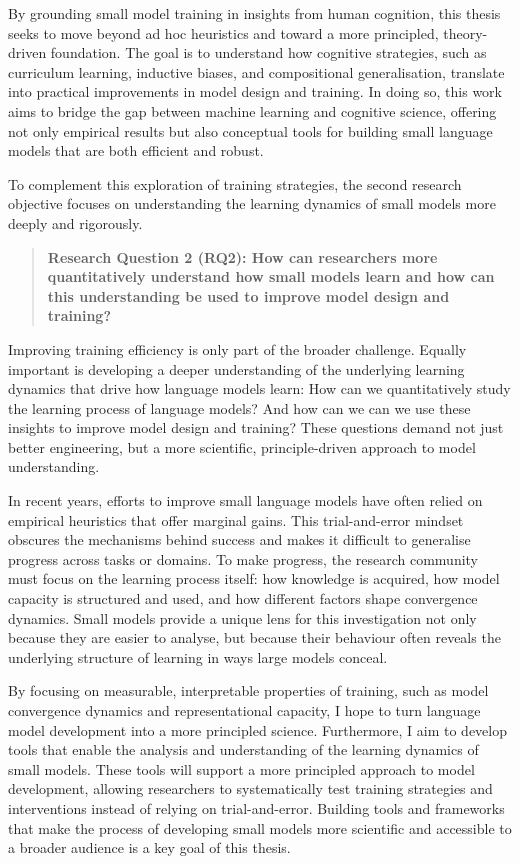 By grounding small model training in insights from human cognition, this thesis seeks to move beyond ad hoc heuristics and toward a more principled, theory-driven foundation. The goal is to understand how cognitive strategies, such as curriculum learning, inductive biases, and compositional generalisation, translate into practical improvements in model design and training. In doing so, this work aims to bridge the gap between machine learning and cognitive science, offering not only empirical results but also conceptual tools for building small language models that are both efficient and robust.

To complement this exploration of training strategies, the second research objective focuses on understanding the learning dynamics of small models more deeply and rigorously.

\begin{quote}
    \textbf{Research Question 2 (RQ2): How can researchers more quantitatively understand how small models learn and how can this understanding be used to improve model design and training?}
\end{quote}

Improving training efficiency is only part of the broader challenge. Equally important is developing a deeper understanding of the underlying learning dynamics that drive how language models learn: How can we quantitatively study the learning process of language models? And how can we can we use these insights to improve model design and training? These questions demand not just better engineering, but a more scientific, principle-driven approach to model understanding.

In recent years, efforts to improve small language models have often relied on empirical heuristics that offer marginal gains. This trial-and-error mindset obscures the mechanisms behind success and makes it difficult to generalise progress across tasks or domains. To make progress, the research community must focus on the learning process itself: how knowledge is acquired, how model capacity is structured and used, and how different factors shape convergence dynamics. Small models provide a unique lens for this investigation not only because they are easier to analyse, but because their behaviour often reveals the underlying structure of learning in ways large models conceal.

By focusing on measurable, interpretable properties of training, such as model convergence dynamics and representational capacity, I hope to turn language model development into a more principled science. Furthermore, I aim to develop tools that enable the analysis and understanding of the learning dynamics of small models. These tools will support a more principled approach to model development, allowing researchers to systematically test training strategies and interventions instead of relying on trial-and-error. Building tools and frameworks that make the process of developing small models more scientific and accessible to a broader audience is a key goal of this thesis.
